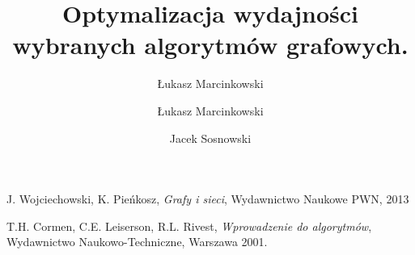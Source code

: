 \documentclass[12pt,oneside,a4paper]{article}
\begin{document}
\author{Łukasz Marcinkowski}
\author{Łukasz Marcinkowski \and Jacek Sosnowski}
\title{Optymalizacja wydajności wybranych algorytmów grafowych.}
\maketitle









\pagebreak

\begin{thebibliography}{9}

 J. Wojciechowski, K. Pieńkosz, \emph{Grafy i sieci}, Wydawnictwo Naukowe PWN, 2013

 T.H. Cormen, C.E. Leiserson, R.L. Rivest, \emph{Wprowadzenie do algorytmów}, Wydawnictwo
Naukowo-Techniczne, Warszawa 2001.

\end{thebibliography}
\end{document}
